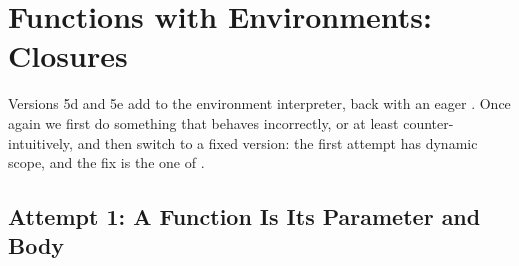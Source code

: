 \section{Functions with Environments: Closures}
\label{sec:closures}

Versions 5d and 5e add  to the environment interpreter, back with an eager . Once again we first do something that behaves incorrectly, or at least counter-intuitively, and then switch to a fixed version: the first attempt has dynamic scope, and the fix is the one of .

\subsection{Attempt 1: A Function Is Its Parameter and Body}

